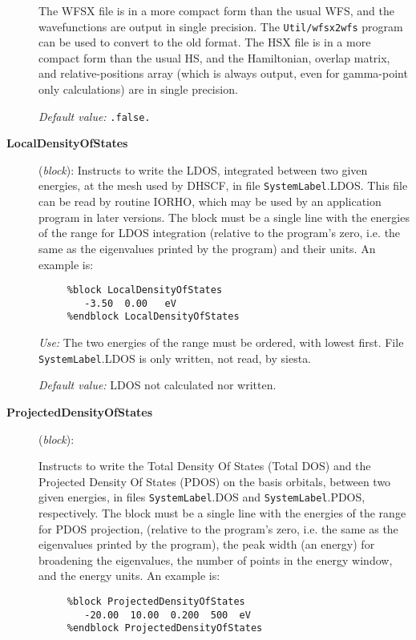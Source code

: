 \documentclass[11pt]{article}
\begin{document}
\begin{description}
The WFSX file is in a more compact form than the usual WFS, and the
wavefunctions are output in single precision. The {\tt Util/wfsx2wfs}
program can be used to convert to the old format.
The HSX file is in a more compact form than the usual HS, and the
Hamiltonian, overlap matrix, and relative-positions array (which is
always output, even for gamma-point only calculations) are in
single precision.

{\it Default value:} {\tt .false.}
        
\item[{\bf LocalDensityOfStates}] ({\it block}): 
Instructs to write the LDOS, integrated between two given energies,
at the mesh used by DHSCF,
in file {\tt SystemLabel}.LDOS. This file can be read by routine IORHO,
which may be used by an application program in later versions.
The block must be a single line with the energies of the range for 
LDOS integration
(relative to the program's zero, i.e. the same as the eigenvalues
printed by the program) and their units.
An example is:

\begin{verbatim}
     %block LocalDensityOfStates
        -3.50  0.00   eV
     %endblock LocalDensityOfStates
\end{verbatim}

{\it Use:} The two energies of the range must be ordered,
with lowest first.
File {\tt SystemLabel}.LDOS is only written, not read, by siesta.

{\it Default value:} LDOS not calculated nor written.
        

\item[{\bf ProjectedDensityOfStates}] ({\it block}):

Instructs to write the Total Density Of States (Total DOS) and the 
Projected Density Of States (PDOS) on the basis orbitals,
between two given energies,
in files {\tt SystemLabel}.DOS and 
{\tt SystemLabel}.PDOS, respectively. 
The block must be a single line with the energies of the range for 
PDOS projection,
(relative to the program's zero, i.e. the same as the eigenvalues
printed by the program), the peak width (an energy) for broadening
the eigenvalues, the number of points in the energy window, 
and the energy units.
An example is:

\begin{verbatim}
     %block ProjectedDensityOfStates
        -20.00  10.00  0.200  500  eV
     %endblock ProjectedDensityOfStates
\end{verbatim}


\end{description}
\end{document}
